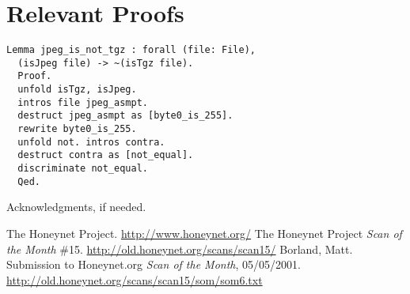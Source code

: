 \documentclass[nocopyrightspace]{sigplanconf}
\begin{document}
\appendix
\section{Relevant Proofs}

\begin{lstlisting}
Lemma jpeg_is_not_tgz : forall (file: File),
  (isJpeg file) -> ~(isTgz file).
  Proof.
  unfold isTgz, isJpeg.
  intros file jpeg_asmpt.
  destruct jpeg_asmpt as [byte0_is_255].
  rewrite byte0_is_255.
  unfold not. intros contra.
  destruct contra as [not_equal].
  discriminate not_equal.
  Qed.
\end{lstlisting}

\acks

Acknowledgments, if needed.





\begin{thebibliography}{}
\softraggedright

The Honeynet Project. \url{http://www.honeynet.org/}
The Honeynet Project \emph{Scan of the Month} \#15.
\url{http://old.honeynet.org/scans/scan15/}
Borland, Matt. Submission to Honeynet.org \emph{Scan of the Month},
05/05/2001. \url{http://old.honeynet.org/scans/scan15/som/som6.txt}

\end{thebibliography}
\end{document}
